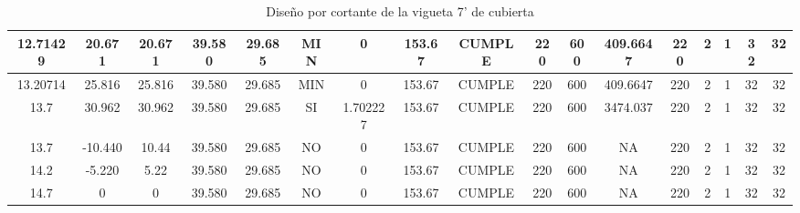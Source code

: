 \begin{table}[h]
{\begin{tabular}{|c|c|c|c|c|c|c|c|c|c|c|c|c|c|c|c|c|}
    \hline
    12.71429 & 20.671 & 20.671 & 39.580 & 29.685 & MIN & 0   & 153.67 & CUMPLE & 220 & 600 & 409.6647 & 220 & 2   & 1   & 32  & 32 \bigstrut\\
    \hline
    13.20714 & 25.816 & 25.816 & 39.580 & 29.685 & MIN & 0   & 153.67 & CUMPLE & 220 & 600 & 409.6647 & 220 & 2   & 1   & 32  & 32 \bigstrut\\
    \hline
    13.7 & 30.962 & 30.962 & 39.580 & 29.685 & SI  & 1.702227 & 153.67 & CUMPLE & 220 & 600 & 3474.037 & 220 & 2   & 1   & 32  & 32 \bigstrut\\
    \hline
    13.7 & -10.440 & 10.44 & 39.580 & 29.685 & NO  & 0   & 153.67 & CUMPLE & 220 & 600 & NA  & 220 & 2   & 1   & 32  & 32 \bigstrut\\
    \hline
    14.2 & -5.220 & 5.22 & 39.580 & 29.685 & NO  & 0   & 153.67 & CUMPLE & 220 & 600 & NA  & 220 & 2   & 1   & 32  & 32 \bigstrut\\
    \hline
    14.7 & 0   & 0   & 39.580 & 29.685 & NO  & 0   & 153.67 & CUMPLE & 220 & 600 & NA  & 220 & 2   & 1   & 32  & 32 \bigstrut\\
    \hline
      
    
    \end{tabular}}%
    \caption{Diseño por cortante de la vigueta 7' de cubierta}
  \label{tab:CORT VT7' CUB}%
\end{table}%
